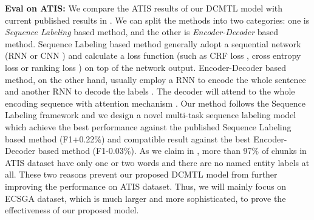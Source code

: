 \noindent
\textbf{Eval on ATIS:} We compare the ATIS results of our DCMTL model with current published results in .
We can split the methods into two categories:
one is \emph{Sequence Labeling} based method, and the other is \emph{Encoder-Decoder} based method.
Sequence Labeling based method generally adopt a sequential network
(RNN \cite{yao2013recurrent,yao2014spoken,liu2015recurrent,peng2015recurrent,vu2016bi} or CNN \cite{xu2013convolutional,vu2016sequential})
and calculate a loss function (such as CRF loss \cite{xu2013convolutional}, cross entropy loss \cite{yao2013recurrent,yao2014spoken} or ranking loss \cite{vu2016bi}) on top of the network output.
Encoder-Decoder based method, on the other hand, 
usually employ a RNN to encode the whole sentence 
and another RNN to decode the labels \cite{kurata2016leveraging}.
The decoder will attend to the whole encoding sequence with attention mechanism \cite{zhu2017encoder,zhai2017neural}.
Our method follows the Sequence Labeling framework 
and we design a novel multi-task sequence labeling model
which achieve the best performance against the published Sequence Labeling based method (F1+0.22\%)
and compatible result against the best Encoder-Decoder based method (F1-0.03\%).
As we claim in , 
more than 97\% of chunks in ATIS dataset have only one or two words and there are no named entity labels at all.
These two reasons prevent our proposed DCMTL model from further improving the performance on ATIS dataset.
Thus, we will mainly focus on ECSGA dataset, 
which is much larger and more sophisticated,
to prove the effectiveness of our proposed model.

